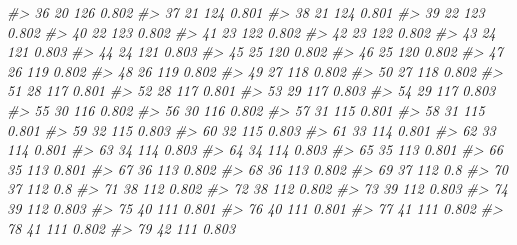 \documentclass[
]{book}
\newenvironment{Shaded}{\begin{snugshade}}{\end{snugshade}}
\newcommand{\CommentTok}[1]{\textcolor[rgb]{0.56,0.35,0.01}{\textit{#1}}}
\begin{document}
\begin{Shaded}
\begin{Highlighting}[]
\CommentTok{\#\textgreater{} 36          20      126 0.802}
\CommentTok{\#\textgreater{} 37          21      124 0.801}
\CommentTok{\#\textgreater{} 38          21      124 0.801}
\CommentTok{\#\textgreater{} 39          22      123 0.802}
\CommentTok{\#\textgreater{} 40          22      123 0.802}
\CommentTok{\#\textgreater{} 41          23      122 0.802}
\CommentTok{\#\textgreater{} 42          23      122 0.802}
\CommentTok{\#\textgreater{} 43          24      121 0.803}
\CommentTok{\#\textgreater{} 44          24      121 0.803}
\CommentTok{\#\textgreater{} 45          25      120 0.802}
\CommentTok{\#\textgreater{} 46          25      120 0.802}
\CommentTok{\#\textgreater{} 47          26      119 0.802}
\CommentTok{\#\textgreater{} 48          26      119 0.802}
\CommentTok{\#\textgreater{} 49          27      118 0.802}
\CommentTok{\#\textgreater{} 50          27      118 0.802}
\CommentTok{\#\textgreater{} 51          28      117 0.801}
\CommentTok{\#\textgreater{} 52          28      117 0.801}
\CommentTok{\#\textgreater{} 53          29      117 0.803}
\CommentTok{\#\textgreater{} 54          29      117 0.803}
\CommentTok{\#\textgreater{} 55          30      116 0.802}
\CommentTok{\#\textgreater{} 56          30      116 0.802}
\CommentTok{\#\textgreater{} 57          31      115 0.801}
\CommentTok{\#\textgreater{} 58          31      115 0.801}
\CommentTok{\#\textgreater{} 59          32      115 0.803}
\CommentTok{\#\textgreater{} 60          32      115 0.803}
\CommentTok{\#\textgreater{} 61          33      114 0.801}
\CommentTok{\#\textgreater{} 62          33      114 0.801}
\CommentTok{\#\textgreater{} 63          34      114 0.803}
\CommentTok{\#\textgreater{} 64          34      114 0.803}
\CommentTok{\#\textgreater{} 65          35      113 0.801}
\CommentTok{\#\textgreater{} 66          35      113 0.801}
\CommentTok{\#\textgreater{} 67          36      113 0.802}
\CommentTok{\#\textgreater{} 68          36      113 0.802}
\CommentTok{\#\textgreater{} 69          37      112   0.8}
\CommentTok{\#\textgreater{} 70          37      112   0.8}
\CommentTok{\#\textgreater{} 71          38      112 0.802}
\CommentTok{\#\textgreater{} 72          38      112 0.802}
\CommentTok{\#\textgreater{} 73          39      112 0.803}
\CommentTok{\#\textgreater{} 74          39      112 0.803}
\CommentTok{\#\textgreater{} 75          40      111 0.801}
\CommentTok{\#\textgreater{} 76          40      111 0.801}
\CommentTok{\#\textgreater{} 77          41      111 0.802}
\CommentTok{\#\textgreater{} 78          41      111 0.802}
\CommentTok{\#\textgreater{} 79          42      111 0.803}

\end{Highlighting}
\end{Shaded}
\end{document}

